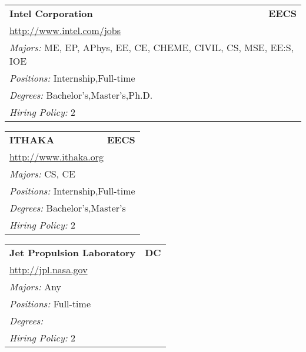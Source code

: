 \documentclass[twoside]{article}
\begin{document}
\begin{center}
\begin{multicols}{3}
\begin{FlushLeft}
\begin{minipage}{\columnwidth}
\end{minipage}
 
\begin{minipage}{\columnwidth}\begin{tabularx}{.95\columnwidth}{Xr}
                 {\Large\bf Intel Corporation} & {\Large\bf EECS}\\
    \multicolumn{2}{p{.95\columnwidth}}{\url{http://www.intel.com/jobs}}\\
    \multicolumn{2}{p{.95\columnwidth}}{\emph{Majors:} ME, EP, APhys, EE, CE, CHEME, CIVIL, CS, MSE, EE:S, IOE}\\
    \multicolumn{2}{p{.95\columnwidth}}{\emph{Positions:} Internship,Full-time}\\
    \multicolumn{2}{p{.95\columnwidth}}{\emph{Degrees:} Bachelor's,Master's,Ph.D.}\\
    \multicolumn{2}{p{.95\columnwidth}}{\emph{Hiring Policy:} 2}\\
    \end{tabularx}
    
\end{minipage}
 
\begin{minipage}{\columnwidth}\begin{tabularx}{.95\columnwidth}{Xr}
                 {\Large\bf ITHAKA} & {\Large\bf EECS}\\
    \multicolumn{2}{p{.95\columnwidth}}{\url{http://www.ithaka.org}}\\
    \multicolumn{2}{p{.95\columnwidth}}{\emph{Majors:} CS, CE}\\
    \multicolumn{2}{p{.95\columnwidth}}{\emph{Positions:} Internship,Full-time}\\
    \multicolumn{2}{p{.95\columnwidth}}{\emph{Degrees:} Bachelor's,Master's}\\
    \multicolumn{2}{p{.95\columnwidth}}{\emph{Hiring Policy:} 2}\\
    \end{tabularx}
    
\end{minipage}
 
\begin{minipage}{\columnwidth}\begin{tabularx}{.95\columnwidth}{Xr}
                 {\Large\bf Jet Propulsion Laboratory} & {\Large\bf DC}\\
    \multicolumn{2}{p{.95\columnwidth}}{\url{http://jpl.nasa.gov}}\\
    \multicolumn{2}{p{.95\columnwidth}}{\emph{Majors:} Any}\\
    \multicolumn{2}{p{.95\columnwidth}}{\emph{Positions:} Full-time}\\
    \multicolumn{2}{p{.95\columnwidth}}{\emph{Degrees:} }\\
    \multicolumn{2}{p{.95\columnwidth}}{\emph{Hiring Policy:} 2}\\
    \end{tabularx}
    

\end{minipage}
\end{FlushLeft}
\end{multicols}
\end{center}
\end{document}
